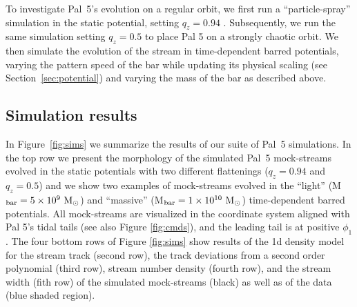 \documentclass[twocolumn]{aastex62}
\newcommand{\msun}{\textrm{M}_\odot}
\begin{document}
To investigate Pal~5's evolution on a regular orbit, we first run a ``particle-spray'' simulation in the static potential, setting $q_z = 0.94$ \citep{Bovy:2016}.
Subsequently, we run the same simulation setting $q_z = 0.5$ to place Pal 5 on a strongly chaotic orbit.
We then simulate the evolution of the stream in time-dependent barred potentials, varying the pattern speed of the bar while updating its physical scaling (see Section~\ref{sec:potential}) and varying the mass of the bar as described above.


\subsection{Simulation results}
\label{sec:sim_results}
In Figure~\ref{fig:sims} we summarize the results of our suite of Pal~5 simulations. In the top row we present the morphology of the simulated Pal~5 mock-streams evolved in the static potentials with two different flattenings ($q_z = 0.94$ and $q_z = 0.5$) and we show two examples of mock-streams evolved in the ``light'' (M$_{\rm bar} = 5\times 10^9~\msun$) and ``massive'' (M$_{\rm bar} = 1\times 10^{10}~\msun$) time-dependent barred potentials. All mock-streams are visualized in the coordinate system aligned with Pal 5's tidal tails (see also Figure \ref{fig:cmds}), and the leading tail is at positive $\phi_1$. The four bottom rows of Figure \ref{fig:sims} show results of the 1d density model for the stream track (second row), the track deviations from a second order polynomial (third row), stream number density (fourth row), and the stream width (fith row) of the simulated mock-streams (black) as well as of the data (blue shaded region).
\end{document}

